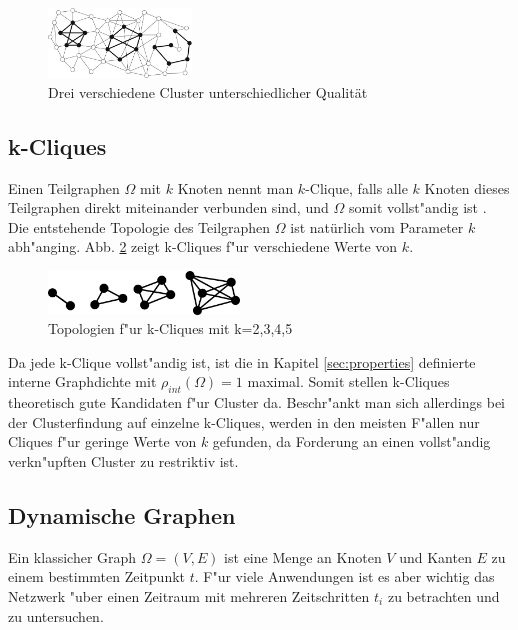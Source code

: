 \documentclass[journal]{vgtc}
\begin{document}
  \begin{figure}[h]
    \centering
    \includegraphics[width=1.5in]{images/good_cluster}
    \caption{\label{fig:comp_cluster} Drei verschiedene Cluster unterschiedlicher Qualität \cite{Schaeffer}}
  \end{figure}
  
  \subsection{k-Cliques}
  \label{sec:k_cliques}
  	Einen Teilgraphen $\Omega$ mit $k$ Knoten nennt man $k$-Clique, falls alle $k$ Knoten dieses 
  	Teilgraphen direkt miteinander verbunden sind, und $\Omega$ somit vollst"andig ist \cite{CPM}. 
  	Die entstehende Topologie des Teilgraphen $\Omega$ ist natürlich vom Parameter $k$ abh"anging.
  	Abb. \ref{fig:k_cliques} zeigt k-Cliques f"ur verschiedene Werte von $k$.
  	
  	\begin{figure}[h]
  	 \centering
  	 \includegraphics[width=2in]{images/k-cliques-example}
  	 \caption{\label{fig:k_cliques} Topologien f"ur k-Cliques mit k=2,3,4,5}
  	\end{figure}

  	
  	Da jede k-Clique vollst"andig ist, ist die in Kapitel \ref{sec:properties} definierte
  	interne Graphdichte mit $\rho_{int}(\Omega)=1$ maximal. Somit stellen k-Cliques theoretisch gute 
  	Kandidaten f"ur Cluster da. Beschr"ankt man sich allerdings bei der Clusterfindung auf einzelne k-Cliques,
  	werden in den meisten F"allen nur Cliques f"ur geringe Werte von $k$ gefunden, da Forderung an einen vollst"andig
  	verkn"upften Cluster zu restriktiv ist.
    
  \subsection{Dynamische Graphen}
	Ein klassicher Graph $\Omega=(V,E)$ ist eine Menge an Knoten $V$ und
	Kanten $E$ zu einem bestimmten Zeitpunkt $t$. F"ur viele Anwendungen
	ist es aber wichtig das Netzwerk "uber einen Zeitraum mit mehreren Zeitschritten $t_i$ zu
	betrachten und zu untersuchen.
	
\end{document}
